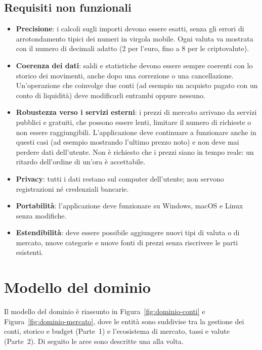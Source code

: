 \documentclass[11pt,a4paper,openright]{report}
\begin{document}
\subsection*{Requisiti non funzionali}

\begin{itemize}
  \item \textbf{Precisione}: i calcoli sugli importi devono essere esatti, senza gli errori di
  arrotondamento tipici dei numeri in virgola mobile. Ogni valuta va mostrata con il numero di decimali
  adatto (2 per l'euro, fino a 8 per le criptovalute).
  \item \textbf{Coerenza dei dati}: saldi e statistiche devono essere sempre coerenti con lo storico dei
  movimenti, anche dopo una correzione o una cancellazione. Un'operazione che coinvolge due conti (ad
  esempio un acquisto pagato con un conto di liquidità) deve modificarli entrambi oppure nessuno.
  \item \textbf{Robustezza verso i servizi esterni}: i prezzi di mercato arrivano da servizi pubblici e
  gratuiti, che possono essere lenti, limitare il numero di richieste o non essere raggiungibili.
  L'applicazione deve continuare a funzionare anche in questi casi (ad esempio mostrando l'ultimo prezzo
  noto) e non deve mai perdere dati dell'utente. Non è richiesto che i prezzi siano in tempo reale: un
  ritardo dell'ordine di un'ora è accettabile.
  \item \textbf{Privacy}: tutti i dati restano sul computer dell'utente; non servono registrazioni né
  credenziali bancarie.
  \item \textbf{Portabilità}: l'applicazione deve funzionare su Windows, macOS e Linux senza modifiche.
  \item \textbf{Estendibilità}: deve essere possibile aggiungere nuovi tipi di valuta o di mercato, nuove
  categorie e nuove fonti di prezzi senza riscrivere le parti esistenti.
\end{itemize}

\section{Modello del dominio}
\enlargethispage{2\baselineskip}

Il modello del dominio è riassunto in Figura~\ref{fig:dominio-conti} e Figura~\ref{fig:dominio-mercato}, dove le entità sono suddivise tra la gestione dei conti, storico e budget (Parte~1) e l'ecosistema di mercato, tassi e valute (Parte~2). Di seguito le aree sono descritte una alla volta.
\end{document}
